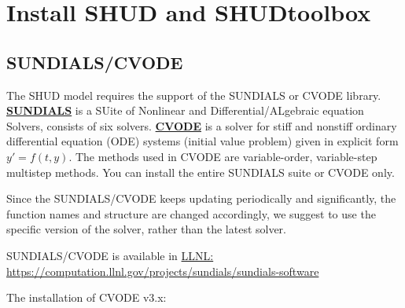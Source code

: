 \documentclass[]{scrbook}
\begin{document}
\chapter{Install SHUD and
SHUDtoolbox}\label{install-shud-and-shudtoolbox}

\section{SUNDIALS/CVODE}\label{sundialscvode}

The SHUD model requires the support of the SUNDIALS or CVODE library.
\href{https://computation.llnl.gov/projects/sundials}{\textbf{SUNDIALS}}
is a SUite of Nonlinear and Differential/ALgebraic equation Solvers,
consists of six solvers.
\href{https://computation.llnl.gov/projects/sundials/cvode}{\textbf{CVODE}}
is a solver for stiff and nonstiff ordinary differential equation (ODE)
systems (initial value problem) given in explicit form \(y' = f(t,y)\).
The methods used in CVODE are variable-order, variable-step multistep
methods. You can install the entire SUNDIALS suite or CVODE only.

Since the SUNDIALS/CVODE keeps updating periodically and significantly,
the function names and structure are changed accordingly, we suggest to
use the specific version of the solver, rather than the latest solver.

SUNDIALS/CVODE is available in
\href{https://computation.llnl.gov/projects/sundials/sundials-software}{LLNL:
https://computation.llnl.gov/projects/sundials/sundials-software}

The installation of CVODE v3.x:
\end{document}

